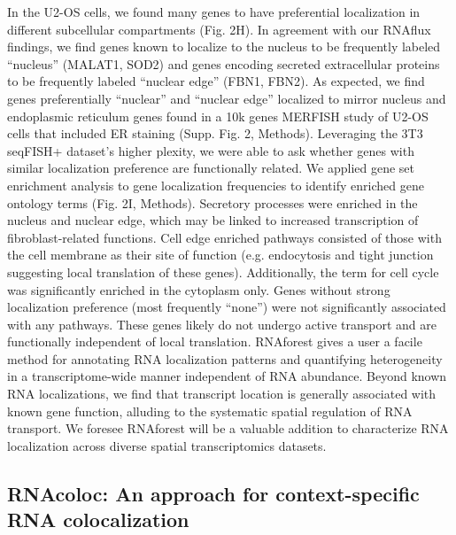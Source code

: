 In the U2-OS cells, we found many genes to have preferential localization in different subcellular compartments (Fig. 2H). In agreement with our RNAflux findings, we find genes known to localize to the nucleus\cite{moffittHighthroughputSinglecellGeneexpression2016,kumarIntracellularSpatialTranscriptomic2023} to be frequently labeled ``nucleus'' (MALAT1, SOD2) and genes encoding secreted extracellular proteins\cite{chenRNAImagingSpatially2015} to be frequently labeled ``nuclear edge'' (FBN1, FBN2). As expected, we find genes preferentially ``nuclear'' and ``nuclear edge'' localized to mirror nucleus and endoplasmic reticulum genes found in a 10k genes MERFISH study of U2-OS cells that included ER staining\cite{xiaSpatialTranscriptomeProfiling2019} (Supp. Fig. 2, Methods). Leveraging the 3T3 seqFISH+ dataset's higher plexity, we were able to ask whether genes with similar localization preference are functionally related. We applied gene set enrichment analysis to gene localization frequencies to identify enriched gene ontology terms\cite{thegeneontologyconsortiumGeneOntologyResource2021} (Fig. 2I, Methods). Secretory processes were enriched in the nucleus and nuclear edge, which may be linked to increased transcription of fibroblast-related functions. Cell edge enriched pathways consisted of those with the cell membrane as their site of function (e.g. endocytosis and tight junction suggesting local translation of these genes). Additionally, the term for cell cycle was significantly enriched in the cytoplasm only. Genes without strong localization preference (most frequently ``none'') were not significantly associated with any pathways. These genes likely do not undergo active transport and are functionally independent of local translation. 
RNAforest gives a user a facile method for annotating RNA localization patterns and quantifying heterogeneity in a transcriptome-wide manner independent of RNA abundance. Beyond known RNA localizations, we find that transcript location is generally associated with known gene function, alluding to the systematic spatial regulation of RNA transport. We foresee RNAforest will be a valuable addition to characterize RNA localization across diverse spatial transcriptomics datasets. 

\subsection{RNAcoloc: An approach for context-specific RNA colocalization}

